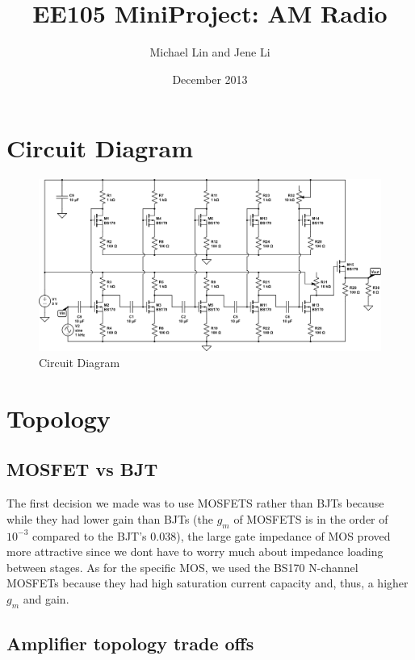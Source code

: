 \documentclass[11pt, twoside, letterpaper]{article}
\title{EE105 MiniProject: AM Radio}
\author{Michael Lin and Jene Li}
\date{December 2013}
\begin{document}
\maketitle

\section{Circuit Diagram}
\begin{figure}[htbp]
	\begin{center}
		\includegraphics[scale=0.75,angle=-90]{circuitdiagram.png}
		\caption{Circuit Diagram}
	\end{center}
\end{figure}
\FloatBarrier
\newpage
\section{Topology}
\subsection{MOSFET vs BJT}

The first decision we made was to use MOSFETS rather than BJTs because while they had lower gain than BJTs (the $g_m$ of MOSFETS
is in the order of $10^{-3}$ compared to the BJT's $0.038$), the large gate impedance of MOS proved more attractive since we dont have to
worry much about impedance loading between stages. As for the specific MOS, we used the BS170 N-channel MOSFETs because they had high saturation
current capacity and, thus, a higher $g_m$ and gain.

\subsection{Amplifier topology trade offs}
\end{document}
